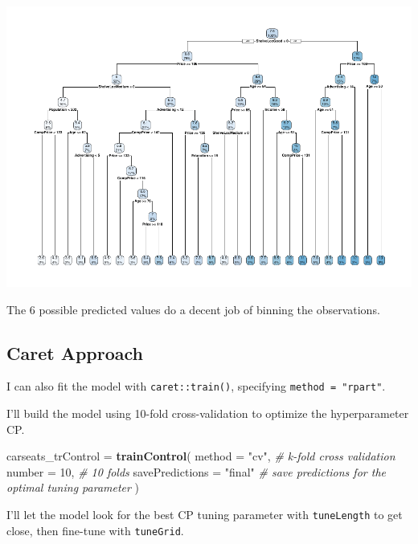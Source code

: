 \documentclass[
]{book}
\newenvironment{Shaded}{\begin{snugshade}}{\end{snugshade}}
\newcommand{\CommentTok}[1]{\textcolor[rgb]{0.56,0.35,0.01}{\textit{#1}}}
\newcommand{\DataTypeTok}[1]{\textcolor[rgb]{0.13,0.29,0.53}{#1}}
\newcommand{\DecValTok}[1]{\textcolor[rgb]{0.00,0.00,0.81}{#1}}
\newcommand{\KeywordTok}[1]{\textcolor[rgb]{0.13,0.29,0.53}{\textbf{#1}}}
\newcommand{\NormalTok}[1]{#1}
\newcommand{\StringTok}[1]{\textcolor[rgb]{0.31,0.60,0.02}{#1}}
\begin{document}
\includegraphics{data-sci_files/figure-latex/unnamed-chunk-95-1.pdf}

The 6 possible predicted values do a decent job of binning the observations.

\hypertarget{caret-approach-1}{%
\subsection{Caret Approach}\label{caret-approach-1}}

I can also fit the model with \texttt{caret::train()}, specifying \texttt{method\ =\ "rpart"}.

I'll build the model using 10-fold cross-validation to optimize the hyperparameter CP.

\begin{Shaded}
\begin{Highlighting}[]
\NormalTok{carseats_trControl =}\StringTok{ }\KeywordTok{trainControl}\NormalTok{(}
   \DataTypeTok{method =} \StringTok{"cv"}\NormalTok{,  }\CommentTok{# k-fold cross validation}
   \DataTypeTok{number =} \DecValTok{10}\NormalTok{,  }\CommentTok{# 10 folds}
   \DataTypeTok{savePredictions =} \StringTok{"final"}       \CommentTok{# save predictions for the optimal tuning parameter}
\NormalTok{)}
\end{Highlighting}
\end{Shaded}

I'll let the model look for the best CP tuning parameter with \texttt{tuneLength} to get close, then fine-tune with \texttt{tuneGrid}.
\end{document}
